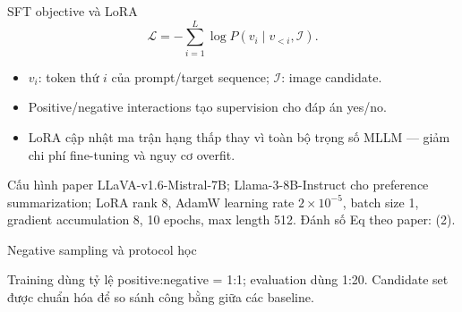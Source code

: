 \begin{frame}{SFT objective và LoRA}
  \begin{equation}\tag{2}
    \mathcal{L}=-\sum_{i=1}^{L}\log P(v_i\mid v_{<i},\mathcal{I}).
  \end{equation}
  \begin{itemize}
    \item $v_i$: token thứ $i$ của prompt/target sequence; $\mathcal{I}$: image candidate.
    \item Positive/negative interactions tạo supervision cho đáp án yes/no.
    \item LoRA cập nhật ma trận hạng thấp thay vì toàn bộ trọng số MLLM — giảm chi phí fine-tuning và nguy cơ overfit.
  \end{itemize}
  \vspace{0.2cm}\begin{block}{Cấu hình paper}
    LLaVA-v1.6-Mistral-7B; Llama-3-8B-Instruct cho preference summarization; LoRA rank 8, AdamW learning rate $2\times10^{-5}$, batch size 1, gradient accumulation 8, 10 epochs, max length 512. Đánh số Eq theo paper: (2).
  \end{block}
\end{frame}

\begin{frame}{Negative sampling và protocol học}
  \vspace{0.35cm}\small
  \scriptsize Training dùng tỷ lệ positive:negative = 1:1; evaluation dùng 1:20. Candidate set được chuẩn hóa để so sánh công bằng giữa các baseline.
\end{frame}

